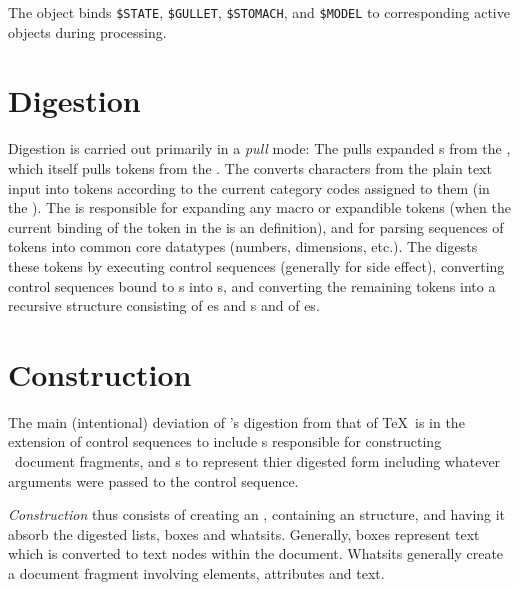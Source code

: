 \documentclass{book}
\begin{document}
The  object binds \verb|$STATE|, \verb|$GULLET|, \verb|$STOMACH|,
and \verb|$MODEL| to corresponding active objects during processing.

\section{Digestion}\label{architecture.digestion}
Digestion is carried out primarily in a \emph{pull} mode: The 
pulls expanded s from the , which itself pulls tokens from 
the .  The  converts characters from the plain text input
into tokens according to the current category codes assigned to them (in the ).  
The  is responsible for expanding any macro or expandible
tokens (when the current binding of the token in the  is 
an  definition), 
and for parsing sequences of tokens into common core datatypes (numbers, dimensions, etc.).
The  digests these tokens by executing  control 
sequences (generally for side effect), converting control sequences bound
to s into s, and converting the remaining tokens
into a recursive structure consisting of
es and s and of es.

\section{Construction}\label{architecture.construction}
The main (intentional) deviation of \LaTeXML's digestion from that of \TeX\ is in the
extension of control sequences to include s responsible for constructing
\XML\ document fragments, and s to represent thier digested form including
whatever arguments were passed to the control sequence.

\emph{Construction} thus consists of creating an , containing
an  structure, and having it absorb the digested lists, boxes
and whatsits.  Generally, boxes represent text which is converted to text nodes within the
document. Whatsits generally create a document fragment involving elements, attributes
and text.  
\end{document}
